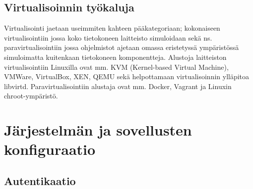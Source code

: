 \subsection{Virtualisoinnin työkaluja}\label{virtualisoinnin_tyokaluja}
Virtualisointi jaetaan useimmiten kahteen pääkategoriaan; kokonaiseen virtualisointiin jossa koko tietokoneen laitteisto simuloidaan sekä ns. paravirtualisointiin jossa ohjelmistot ajetaan omassa eristetyssä ympäristössä simuloimatta kuitenkaan tietokoneen komponentteja.
Alustoja laitteiston virtualisointiin Linuxilla ovat mm. KVM (Kernel-based Virtual Machine), VMWare, VirtualBox, XEN, QEMU sekä helpottamaan virtualisoinnin ylläpitoa libvirtd.
Paravirtualisointiin alustaja ovat mm. Docker, Vagrant ja Linuxin chroot-ympäristö.

\section{Järjestelmän ja sovellusten konfiguraatio}\label{sovellusten_konfiguraatio}

\subsection{Autentikaatio}\label{autentikaatio}
